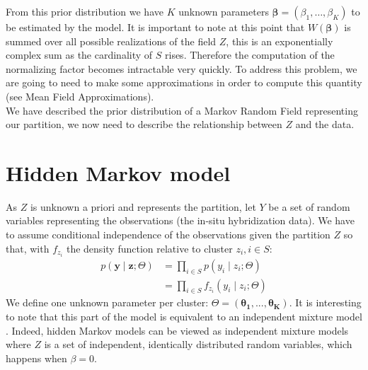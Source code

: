 From this prior distribution we have $K$ unknown parameters $\mathbf{\beta} = (\beta_1, \hdots, \beta_K)$ to be estimated by the model. It is important to note at this point that $W(\mathbf{\beta})$ is summed over all possible realizations of the field $Z$, this is an exponentially complex sum as the cardinality of $S$ rises. Therefore the computation of the normalizing factor becomes intractable very quickly. To address this problem, we are going to need to make some approximations in order to compute this quantity (see Mean Field Approximations).\\

We have described the prior distribution of a Markov Random Field representing our partition, we now need to describe the relationship between $Z$ and the data.

\section{Hidden Markov model}
As $Z$ is unknown a priori and represents the partition, let $Y$ be a set of random variables representing the observations (the in-situ hybridization data). We have to assume conditional independence of the observations given the partition $Z$ so that, with $f_{z_i}$ the density function relative to cluster $z_i, i \in S$:
\begin{align}
p(\mathbf{y} \mid \mathbf{z} ; \Theta) &= \prod_{i \in S} p(y_i \mid z_i ; \Theta)\\
\label{eq:independence}
&= \prod_{i \in S} f_{z_i} (y_i \mid z_i ; \Theta)
\end{align}
We define one unknown parameter per cluster: $\Theta = (\mathbf{\theta_1},...,\mathbf{\theta_K})$. It is interesting to note that this part of the model is equivalent to an independent mixture model \cite{Mclachlan04}. Indeed, hidden Markov models can be viewed as independent mixture models where $Z$ is a set of independent, identically distributed random variables, which happens when $\beta = 0$.\\

